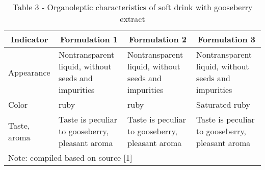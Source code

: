 \begin{table}[H]
  \caption*{Table 3 - Organoleptic characteristics of soft drink with gooseberry extract}
  \centering
  \begin{tabularx}{\textwidth}{|l|X|X|X|}
  \hline
  \multicolumn{1}{|c|}{Indicator}    & \multicolumn{1}{c|}{Formulation 1}                                        & \multicolumn{1}{c|}{Formulation 2}                                        & \multicolumn{1}{c|}{Formulation 3}                   \\ \hline
  \multicolumn{1}{|l|}{Appearance}   & Nontransparent liquid, without seeds and impurities & Nontransparent liquid, without seeds and impurities & Nontransparent liquid, without seeds and impurities \\ \hline
  \multicolumn{1}{|l|}{Color}        & ruby                                                 & ruby                                                 & Saturated ruby                                       \\ \hline
  \multicolumn{1}{|l|}{Taste, aroma} & Taste is peculiar to gooseberry, pleasant aroma      & Taste is peculiar to gooseberry, pleasant aroma      & Taste is peculiar to gooseberry, pleasant aroma      \\ \hline
  \multicolumn{4}{|l|}{Note: compiled based on source {[}1{]}}                                                                                                                                                                                      \\ \hline
  \end{tabularx}
\end{table}







